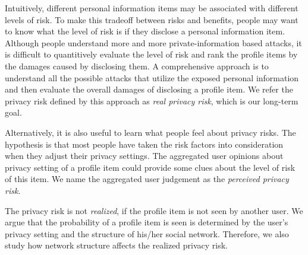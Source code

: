 \documentclass[a4paper]{article}
\begin{document}

Intuitively, different personal information items may be associated
with different levels of risk. To make this tradeoff between risks and
benefits, people may want to know what the level of risk is if they
disclose a personal information item. Although people understand more
and more private-information based attacks, it is difficult to
quantitively evaluate the level of risk and rank the profile items by
the damages caused by disclosing them. A comprehensive approach is to
understand all the possible attacks that utilize the exposed personal
information and then evaluate the overall damages of disclosing a
profile item. We refer the privacy risk defined by this approach as
\emph{real privacy risk}, which is our long-term goal. 

Alternatively, it is also useful to learn what people feel about
privacy risks. The hypothesis is that most people have taken the risk
factors into consideration when they adjust their privacy
settings. The aggregated user opinions about privacy setting of a
profile item could provide some clues about the level of risk of this
item. We name the aggregated user judgement as the \emph{perceived
  privacy risk}.

The privacy risk is not \emph{realized}, if the profile item is not
seen by another user. We argue that the probability of a profile item
is seen is determined by the user's privacy setting and the structure
of his/her social network. Therefore, we also study how network
structure affects the realized privacy risk. 
\end{document}
